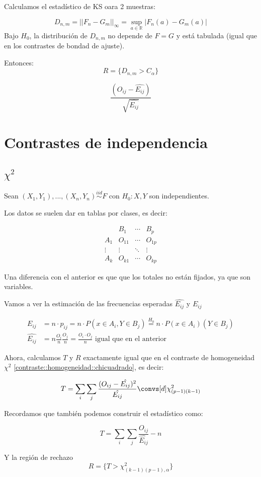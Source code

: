 Calculamos el estadístico de KS oara 2 muestras:

\[
D_{n,m} = ||F_n - G_m ||_{\infty} = \sup_{a∈ℝ} | F_n(a) - G_m(a)|
\]
Bajo $H_0$, la distribución de $D_{n,m}$ no depende de $F=G$ y está tabulada (igual que en los contrastes de bondad de ajuste).

Entonces: \[R = \{ D_{n,m} > C_α\}\]
\begin{defn}
\[
\frac{(O_{ij}-\hat{E_{ij}})}{\sqrt{\hat{E_{ij}}}}
\]
\end{defn} 

\section{Contrastes de independencia}

\subsection{$\chi^2$}

Sean $(X_1,Y_1),...,(X_n,Y_n) \overset{iid}{\sim} F$ con $H_0 : X,Y$ son independientes.

Los datos se suelen dar en tablas por clases, es decir: 

\[
\begin{array}{c|ccc}
&B_1&\cdots & B_p \\\hline
A_1 & O_{11} & \cdots & O_{1p}\\
\vdots & \vdots & \ddots & \vdots \\
A_k & O_{k1} & \cdots & O_{kp} 
\end{array}
\]

Una diferencia con el anterior es que que los totales no están fijados, ya que son variables.

Vamos a ver la estimación de las frecuencias esperadas $\hat{E_{ij}}$ y $E_{ij}$

\begin{align*}
E_{ij} &= n·p_{ij} = n·P(x∈A_i,Y∈B_j) \overset{H_0}{=} n·P(x∈A_i)(Y∈B_j)\\
\hat{E_{ij}} &= n \frac{O_i}{n}\frac{O_j}{n} = \frac{O_i·O_j}{n} \text{ igual que en el anterior}
\end{align*}

Ahora, calculamos $T$ y $R$ exactamente igual que en el contraste de homogeneidad $\chi^2$ \ref{contraste::homogeneidad::chicuadrado}, es decir:

\[T = \sum_i \sum_j \frac{(O_{ij} - \hat{E_{ij}})^2}{\hat{E_{ij}}} \convs[d] \chi^2_{(p-1)(k-1)} \] 

Recordamos que también podemos construir el estadístico como:

\[T = \sum_{i}\sum_j \frac{O_{ij}}{\hat{E_{ij}}} - n\]

Y la región de rechazo \[R = \{T>\chi^2_{(k-1)(p-1),α}\}\]
